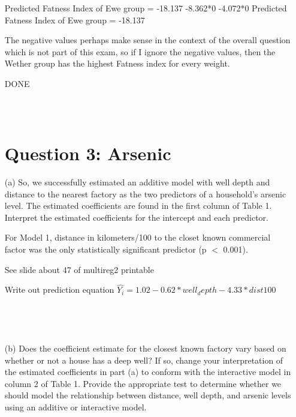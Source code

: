 \documentclass[12pt,letterpaper]{article}
\begin{document}
\begin{enumerate}
		
		Predicted Fatness Index of Ewe group = -18.137 -8.362*0 -4.072*0
		Predicted Fatness Index of Ewe group = -18.137
		
		The negative values perhaps make sense in the context of the overall question which is not part of this exam, so if I ignore the negative values, then the Wether group has the highest Fatness index for every weight.
		
		DONE
		
		\begin{verbatim}
			
			
		\end{verbatim}
		\vspace{.5cm}
		\section*{Question 3: Arsenic}  
		\item [(a)] 
		So, we successfully estimated an additive model with well depth and distance to the
		nearest factory as the two predictors of a household’s arsenic level. The estimated
		coefficients are found in the first column of Table 1. Interpret the estimated coefficients
		for the intercept and each predictor.
		
		For Model 1, distance in kilometers/100 to the closet known commercial factor was the only statistically significant predictor (p $<$ 0.001). 
		
		See slide about 47 of multireg2 printable
		
		Write out prediction equation
		$\hat{Y_i}= 1.02-0.62*well_depth -4.33*dist100$
		
		
		
		
		\begin{verbatim}
			
			
			
		\end{verbatim}
		\item [(b)] Does the coefficient estimate for the closest known factory vary based on whether or not
		a house has a deep well? If so, change your interpretation of the estimated coefficients
		in part (a) to conform with the interactive model in column 2 of Table 1. Provide
		the appropriate test to determine whether we should model the relationship between
		distance, well depth, and arsenic levels using an additive or interactive model.
		
		
		\begin{verbatim}
			
			
			

\end{verbatim}
\end{enumerate}
\end{document}
